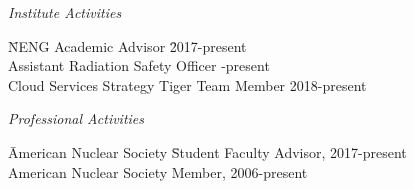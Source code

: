\textit{Institute Activities}
\begin{tabbing}
\hspace*{2 em}\= NENG Academic Advisor  \hspace*{12em} \= 2017-present\\
%
\> Assistant Radiation Safety Officer -present  \\
%
\> Cloud Services Strategy Tiger Team \> Member 2018-present\\
\end{tabbing}

\textit{Professional Activities}
\begin{tabbing}
\hspace*{2 em}\= American Nuclear Society  \hspace*{12em} \= Student Faculty Advisor, 2017-present\\
%
\> American Nuclear Society \> Member, 2006-present  \\
\end{tabbing}

